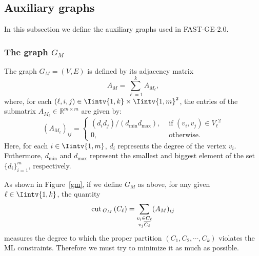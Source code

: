 \subsection{Auxiliary graphs}
In this subsection we define the auxiliary graphs used in FAST-GE-2.0.

\subsubsection*{The graph $G_M$}

\begin{definition}
   The graph $G_M = (V,E)$ is defined by its adjacency matrix 
   \begin{equation}\label{am}
   A_M = \sum_{\ell = 1}^k A_{M_{\ell}},
\end{equation}
   where, for each $(\ell, i, j) \in \Iintv{1,k} \times \Iintv{1, m}^2$, the entries of the submatrix $A_{M_{\ell}} \in \mathbb R^{m \times m}$ are given by:
   \begin{equation}
      (A_{M_{\ell}})_{ij} =
      \begin{cases}
         (d_i d_j) / (d_{\min} d_{\max}), & \text{ if $(v_i, v_j) \in {V_{\ell}}^2$} \\
         0, & \text{ otherwise.}
      \end{cases}
\end{equation}
Here, for each $i \in \Iintv{1,m}$, $d_i$ represents the degree of the vertex $v_i$. 
Futhermore, $d_{\min}$ and $d_{\max}$ represent the smallest and biggest element of the set $\{ d_i \}_{i=1}^m$, respectively.
\end{definition}

As shown in Figure~\vref{gm}, if we define $G_M$ as above, for any given $\ell \in \Iintv{1,k}$, the quantity
\begin{equation}
   \operatorname{cut\,}_{G_M\,}(C_{\ell}) = \sum_{\substack{v_i \in C_{\ell} \\ v_j \overline{C_{\ell}}}} (A_M)_{ij} 
\end{equation}
measures the degree to which the proper partition $(C_1, C_2, \cdots, C_k)$ violates the ML constraints.
Therefore we must try to minimize it as much as possible.

